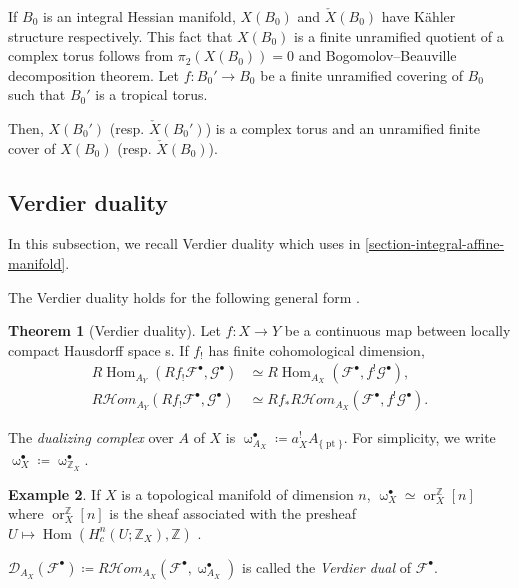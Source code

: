 \documentclass[a4paper,dvipdfmx,reqno,12pt]{amsart}
\theoremstyle{definition}
\newtheorem{theorem}{Theorem}[section]
\newtheorem{example}[theorem]{Example}
\newcommand{\deq}{\coloneqq}
\newcommand{\Z}{\mathbb{Z}}%
\newcommand{\mcal}[1]{\mathcal{#1}}%
\newcommand{\opn}[1]{\operatorname{#1}}
\numberwithin{equation}{section}
\begin{document}
If $B_0$ is an integral Hessian manifold, 
$X(B_0)$ and $\check{X}(B_0)$ have K\"ahler structure 
respectively.
This fact that $X(B_0)$ is a finite unramified quotient
of a complex torus follows from $\pi_2(X(B_0))=0$ 
and Bogomolov--Beauville decomposition theorem.
Let $f:B_0' \to B_0$ be a finite unramified covering of $B_0$ such that $B_0'$ is a tropical torus.

Then, $X(B_0')$ (resp. $\check{X}(B_0')$) 
is a complex torus and an unramified finite cover 
of $X(B_0)$ (resp. $\check{X}(B_0)$). 



\subsection{Verdier duality} \label{section-verdier-dual}
In this subsection, we recall Verdier duality which 
uses in \cref{section-integral-affine-manifold}.

The Verdier duality holds for the following general form
\cite[Proposition 3.1.10]{MR1299726}.


\begin{theorem}[{Verdier duality}]
Let $f\colon X\to Y$ be a continuous map between locally 
compact Hausdorff space s. If $f_!$ has finite cohomological
dimension, 
\begin{align}
R\opn{Hom}_{A_Y}(R f_!\mcal{F}^{\bullet},\mcal{G}^{\bullet})    & \simeq R\opn{Hom}_{A_X}(\mcal{F}^{\bullet},f^{!}\mcal{G}^{\bullet}),        \\
R \mcal{H}om_{A_Y}(R f_! \mcal{F}^{\bullet},\mcal{G}^{\bullet}) & \simeq Rf_* R\mcal{H}om_{A_X}(\mcal{F}^{\bullet},f^{!}\mcal{G}^{\bullet}).
\end{align}
\end{theorem}
The \emph{dualizing complex} over $A$ of $X$ is 
$\upomega_{A_X}^{\bullet}\deq a^{!}_{X}A_{\{\opn{pt}\}}$.
For simplicity, we write 
$\upomega_X^{\bullet}\deq 
\upomega_{\mathbb{Z}_X}^{\bullet}$.

\begin{example}
If $X$ is a topological manifold of dimension $n$, 
$\upomega^{\bullet}_{X}\simeq \opn{or}_{X}^{\Z}[n]$ 
where $\opn{or}_{X}^{\mathbb{Z}}[n]$ is the sheaf 
associated with the presheaf $U\mapsto 
\opn{Hom}(H^{n}_c(U;\mathbb{Z}_{X}),\mathbb{Z})$
\cite[Proposition 3.3.6]{MR1299726}.
\end{example}

$\mathcal{D}_{A_X}(\mathcal{F}^{\bullet})
\deq R\mathcal{H}om_{A_X}(\mathcal{F}^{\bullet},
\upomega_{A_X}^{\bullet})$ 
is called the  \emph{Verdier dual} of 
$\mathcal{F}^{\bullet}$.
\end{document}
